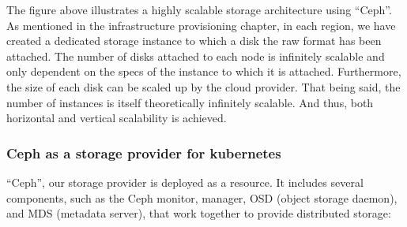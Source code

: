 The figure above illustrates a highly scalable storage architecture using “Ceph”. As mentioned in the infrastructure provisioning chapter, in each region, we have created a dedicated storage instance to which a disk the raw format has been attached. The number of disks attached to each node is infinitely scalable and only dependent on the specs of the instance to which it is attached. Furthermore, the size of each disk can be scaled up by the cloud provider. That being said, the number of instances is itself theoretically infinitely scalable. And thus, both horizontal and vertical scalability is achieved. 

\subsubsection{Ceph as a storage provider for kubernetes }

“Ceph”, our storage provider is deployed as a resource. It includes several components, such as the Ceph monitor, manager, OSD (object storage daemon), and MDS (metadata server), that work together to provide distributed storage: 

